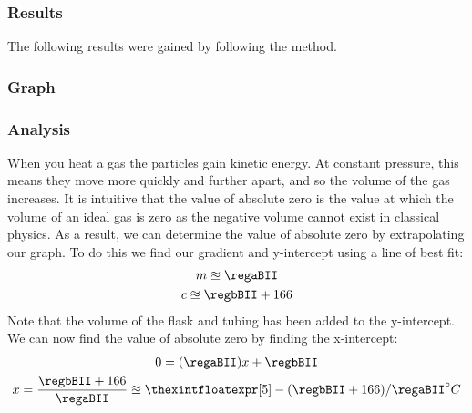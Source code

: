 \subsubsection{Results}
The following results were gained by following the method.
\begin{center}
\end{center}

\subsubsection{Graph}
\begin{figure}[H]
  \centering
\end{figure}

\subsubsection{Analysis}
When you heat a gas the particles gain kinetic energy.
At constant pressure, this means they move more quickly and further apart, and so the volume of the gas increases.
It is intuitive that the value of absolute zero is the value at which the volume of an ideal gas is zero as the negative volume cannot exist in classical physics.
As a result, we can determine the value of absolute zero by extrapolating our graph.
To do this we find our gradient and y-intercept using a line of best fit:
\begin{gather}
    m \approxeq \regaBII \\
    c \approxeq \regbBII + 166
\end{gather}
Note that the volume of the flask and tubing has been added to the y-intercept. We can now find the value of absolute zero by finding the x-intercept:
\begin{gather}
  0 =  (\regaBII)x+\regbBII \\
  x = \frac{\regbBII + 166}{\regaBII} \approxeq {\thexintfloatexpr [5] -(\regbBII+166)/\regaBII \relax} ^\circ C
\end{gather}

